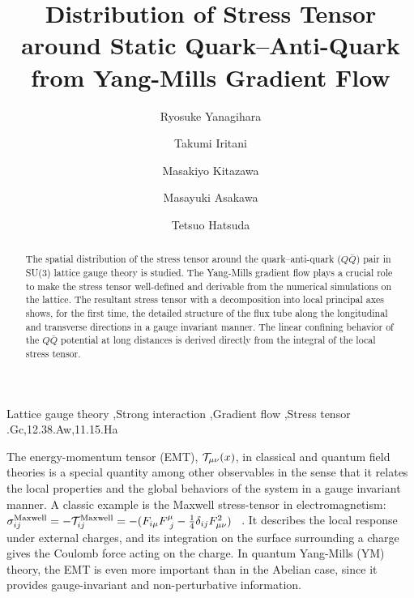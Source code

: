 \documentclass[3p,twocolumn,sort&compress]{elsarticle}
\begin{document}
\title{Distribution of Stress Tensor around Static Quark--Anti-Quark\\ from Yang-Mills Gradient Flow }

\author[osaka]{Ryosuke Yanagihara}

\author[riken]{Takumi Iritani}

\author[osaka,kek]{Masakiyo Kitazawa}

\author[osaka]{Masayuki Asakawa}

\author[riken_i,riken]{Tetsuo Hatsuda}

\address[osaka]{Department of Physics, Osaka University,
Toyonaka, Osaka 560-0043, Japan}

\address[riken]{RIKEN Nishina Center, RIKEN, Wako 351-0198, Japan}

\address[kek]{
  J-PARC Branch, KEK Theory Center,
  Institute of Particle and Nuclear Studies, KEK,
  203-1, Shirakata, Tokai, Ibaraki, 319-1106, Japan }

\address[riken_i]{
  RIKEN Interdisciplinary Theoretical and Mathematical Sciences Program
  (iTHEMS), RIKEN, Wako 351-0198, Japan}
  	
\begin{abstract}
The spatial distribution of the stress tensor around the
quark--anti-quark ($Q\bar{Q}$) pair in SU(3) lattice gauge  theory is studied. The
Yang-Mills gradient flow plays a crucial role to make the stress tensor well-defined 
and derivable from the numerical simulations on the lattice.
The resultant stress tensor with a decomposition into local principal axes shows, for the
first time, the detailed structure of the  flux tube  along the longitudinal and transverse directions  in a gauge invariant manner.
 The linear confining behavior of the $Q\bar{Q}$ potential at long distances
is derived directly from the integral of the local stress tensor.
\end{abstract}

\begin{keyword}
 Lattice gauge theory \sep Strong interaction \sep Gradient flow \sep Stress tensor
 .Gc,12.38.Aw,11.15.Ha
\end{keyword}

\maketitle

The energy-momentum tensor (EMT), ${\cal T}_{\mu \nu}(x)$,
in classical and quantum field theories is a special
quantity among other observables in the sense that it relates
the local properties and the global behaviors of the system in a gauge invariant manner.
A classic example is the Maxwell stress-tensor 
in electromagnetism:
$\sigma_{ij}^{\rm Maxwell}=-{\cal T}_{ij}^{\rm Maxwell} =  -(F_{i\mu} F^{\mu}_{\ j} - \frac{1}{4} \delta_{ij} F_{\mu\nu}^2)$
~\cite{Landau}.
It describes the
local response under external charges, and its integration on
the surface surrounding
a charge gives the Coulomb force acting on the charge. In quantum Yang-Mills (YM) theory,
the EMT is even more important than in the Abelian case, since
it provides gauge-invariant and non-perturbative information.
\end{document}
